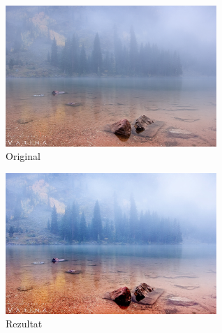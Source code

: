 \documentclass[12pt,a4paper]{article}
\theoremstyle{definition}
\theoremstyle{remark}
\theoremstyle{plain}
\begin{document}
\begin{multicols}{2}
\begin{figure}[H]
\centering
\includegraphics[width=8cm]{images/river.jpg}
  \caption{Original}\label{river}
\end{figure}
\columnbreak
\begin{figure}[H]
\centering
\includegraphics[width=8cm]{images/fuzzy_color_1.jpg}
  \caption{Rezultat}\label{river_output}
\end{figure}
\end{multicols}
\end{document}
